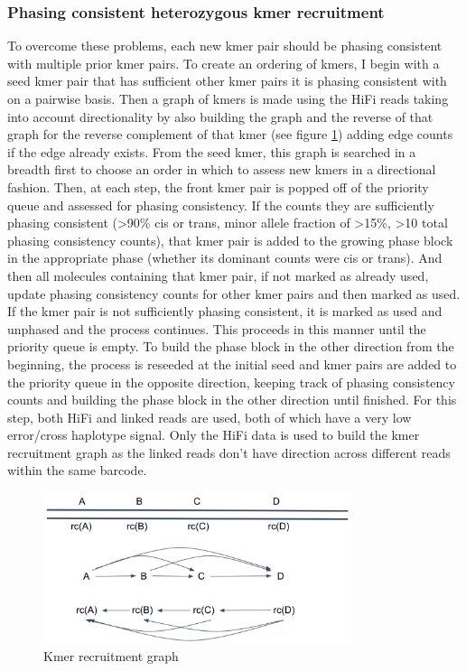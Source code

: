 \subsubsection{Phasing consistent heterozygous kmer recruitment}

\par{
To overcome these problems, each new kmer pair should be phasing consistent with multiple prior kmer pairs. To create an ordering of kmers, I begin with a seed kmer pair that has sufficient other kmer pairs it is phasing consistent with on a pairwise basis. Then a graph of kmers is made using the HiFi reads taking into account directionality by also building the graph and the reverse of that graph for the reverse complement of that kmer (see figure \ref{figure:assemblygraph}) adding edge counts if the edge already exists. From the seed kmer, this graph is searched in a breadth first to choose an order in which to assess new kmers in a directional fashion. Then, at each step, the front kmer pair is popped off of the priority queue and assessed for phasing consistency. If the counts they are sufficiently phasing consistent (>90\% cis or trans, minor allele fraction of >15\%, >10 total phasing consistency counts), that kmer pair is added to the growing phase block in the appropriate phase (whether its dominant counts were cis or trans). And then all molecules containing that kmer pair, if not marked as already used, update phasing consistency counts for other kmer pairs and then marked as used. If the kmer pair is not sufficiently phasing consistent, it is marked as used and unphased and the process continues. This proceeds in this manner until the priority queue is empty. To build the phase block in the other direction from the beginning, the process is reseeded at the initial seed and kmer pairs are added to the priority queue in the opposite direction, keeping track of phasing consistency counts and building the phase block in the other direction until finished. For this step, both HiFi and linked reads are used, both of which have a very low error/cross haplotype signal. Only the HiFi data is used to build the kmer recruitment graph as the linked reads don't have direction across different reads within the same barcode.
}

\begin{figure}[htbp!]
\caption{Kmer recruitment graph}
\label{figure:assemblygraph}
\begin{centering}
\includegraphics[width=0.8\textwidth]{assemblygraph.png}
\end{centering}
\end{figure}

